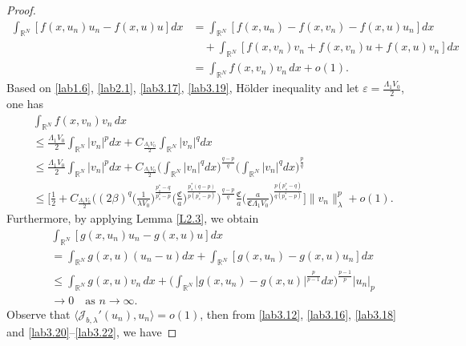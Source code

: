 \documentclass[reqno]{amsart}
\begin{document}
\begin{proof}
\begin{equation}\label{lab3.20}
\begin{split}
\int_{\mathbb{R}^N} [f(x,u_n)u_n-f(x,u)u]dx 
&=\int_{\mathbb{R}^N} [f(x,u_n)-f(x,v_n)-f(x,u)u_n]dx \\
&\quad +\int_{\mathbb{R}^N} [f(x,v_n)v_n+f(x,v_n)u+f(x,u)v_n]dx  \\
&=\int_{\mathbb{R}^N} f(x,v_n)v_n\,dx+o(1).
\end{split}
\end{equation}
Based on \eqref{lab1.6}, \eqref{lab2.1}, \eqref{lab3.17}, \eqref{lab3.19}, 
H\"older inequality and let $\varepsilon=\frac{\Lambda_1 V_0}{2}$, one has
\begin{equation}\label{lab3.21}
\begin{split}
&\int_{\mathbb{R}^N} f(x,v_n)v_n\,dx \\
&\leq \frac{\Lambda_1 V_0}{2}\int_{\mathbb{R}^N}|v_n|^pdx+C_{\frac{\Lambda_1 V_0}{2}}\int_{\mathbb{R}^N}|v_n|^qdx \\
&\leq \frac{\Lambda_1 V_0}{2}\int_{\mathbb{R}^N}|v_n|^pdx
+C_{\frac{\Lambda_1 V_0}{2}}\Big(\int_{\mathbb{R}^N}|v_n|^qdx
 \Big)^{\frac{q-p}{q}}\Big(\int_{\mathbb{R}^N}|v_n|^qdx\Big)^{\frac{p}{q}}  \\
&\leq \Big[\frac{1}{2}+C_{\frac{\Lambda_1 V_0}{2}}\Big((2\beta)^q
 \Big(\frac{1}{\lambda V_0}\Big)^{\frac{p_s^*-q}{p_s^*-p}}
 \Big(\frac{\mathfrak{C}}{a}\Big)^{\frac{p_s^*(q-p)}{p(p_s^*-p)}}\Big)
^{\frac{q-p}{q}}\frac{\mathfrak{C}}{a} 
 \Big(\frac{a}{\mathfrak{C}\Lambda_1V_0}\Big)^{\frac{p(p^*_s-q)}{q(p^*_s-p)}}
 \Big]\|v_n\|^p_\lambda+o(1).
\end{split}
\end{equation}
Furthermore, by applying Lemma \ref{L2.3}, we  obtain 
\begin{equation}\label{lab3.22}
\begin{split}
&\int_{\mathbb{R}^N}[g(x,u_n)u_n-g(x,u)u]dx  \\
&=\int_{\mathbb{R}^N} g(x,u)(u_n-u)dx+\int_{\mathbb{R}^N} [g(x,u_n)-g(x,u)u_n]dx \\
&\leq\int_{\mathbb{R}^N} g(x,u)v_n\,dx+\Big(\int_{\mathbb{R}^N} |g(x,u_n)-g(x,u)|^{\frac{p}{p-1}}dx\Big)^{\frac{p-1}{p}}|u_n|_p \\
&\to  0\quad \text{as }  n\to \infty.
\end{split}
\end{equation}
Observe that $\langle \mathcal{J}_{b,\lambda}'(u_n), u_n\rangle=o(1)$, 
then from \eqref{lab3.12}, \eqref{lab3.16}, \eqref{lab3.18} and 
\eqref{lab3.20}--\eqref{lab3.22}, we have

\end{proof}
\end{document}
